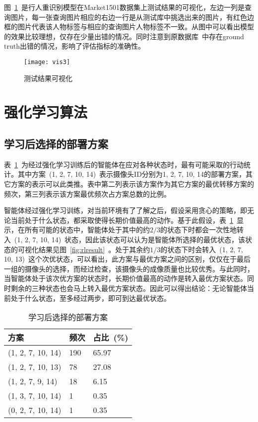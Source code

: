 图~\ref{fig:testvis}~是行人重识别模型在Market1501数据集上测试结果的可视化，左边一列是查询图片，每一张查询图片相应的右边一行是从测试库中挑选出来的图片，有红色边框的图片代表该人物标签与相应的查询图片人物标签不一致。从图中可以看出模型的效果比较理想，仅存在少量出错的情况。同时注意到原数据库~\cite{zheng2015scalable}中存在ground truth出错的情况，影响了评估指标的准确性。

\begin{figure}[!ht]
    \centering
    \texttt{[image: vis3]}
    \caption{测试结果可视化}
    \label{fig:testvis}
\end{figure}

\section{强化学习算法}

\subsection{学习后选择的部署方案}

表~\ref{tab:rlresult}~为经过强化学习训练后的智能体在应对各种状态时，最有可能采取的行动统计。其中方案~(1, 2, 7, 10, 14)~表示摄像头ID分别为1, 2, 7, 10, 14的部署方案，其它方案的表示可以此类推。表中第二列表示该方案作为其它方案的最优转移方案的频次，第三列表示该方案最优频次占方案总数的比例。

智能体经过强化学习训练，对当前环境有了了解之后，假设采用贪心的策略，即无论当前处于什么状态，都采取使得长期价值最高的动作。基于此假设，表~\ref{tab:rlresult}~显示，在所有可能的状态中，智能体处于其中的约$2/3$的状态下时都会一次性地转入~(1, 2, 7, 10, 14)~状态，因此该状态可以认为是智能体所选择的最优状态，该状态的可视化结果见图~\ref{fig:rlresult}~。处于其余约$1/3$的状态下时会转入~(1, 2, 7, 10, 13)~这个次优状态，可以看出，此方案与最优方案之间的区别，仅仅在于最后一组的摄像头的选择，而经过检查，该摄像头的成像质量也比较优秀。与此同时，当智能体处于该次优方案的状态时，长期价值最高的动作是转入最优方案状态。同时剩余的三种状态也会马上转入最优方案状态。因此可以得出结论：无论智能体当前处于什么状态，至多经过两步，即可到达最优状态。

\begin{table}[h!]
    \centering
    \caption{学习后选择的部署方案}
    \label{tab:rlresult}
    \begin{tabularx}{\textwidth}{p{}p{}p{}}
    \toprule
    方案               & 频次  & 占比~(\%)  \\ \midrule
    (1, 2, 7, 10, 14) & 190 & 65.97 \\
    (1, 2, 7, 10, 13) & 78  & 27.08 \\
    (1, 2, 7, 9, 14)  & 18  & 6.15  \\
    (1, 3, 7, 10, 14) & 1   & 0.35  \\
    (0, 2, 7, 10, 14) & 1   & 0.35  \\ \bottomrule
    \end{tabularx}
\end{table}

